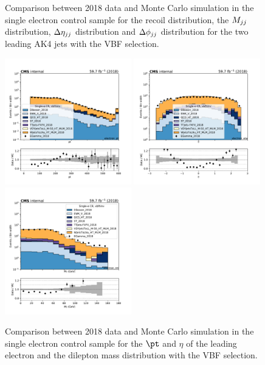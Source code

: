 \begin{figure}[htbp]
\begin{center}
    \end{center}
    \caption{Comparison between 2018 data and Monte Carlo simulation in the single electron control sample for
        the recoil distribution, the $M_{jj}$ distribution, $\Delta \eta_{jj}$ distribution and
        $\Delta \phi_{jj}$ distribution for the two leading AK4 jets with the VBF selection.}
    \label{fig:SE_vbfhinv_2018}
\end{figure}

\begin{figure}[htbp]
    \begin{center}
        \includegraphics[width=0.49\textwidth]{fig/datamc/cr_1e_vbf/cr_1e_vbf_electron_pt_losf_2018.pdf}
        \includegraphics[width=0.49\textwidth]{fig/datamc/cr_1e_vbf/cr_1e_vbf_electron_eta_losf_2018.pdf} \\
        \includegraphics[width=0.49\textwidth]{fig/datamc/cr_1e_vbf/cr_1e_vbf_electron_mt_losf_2018.pdf}
    \end{center}
    \caption{Comparison between 2018 data and Monte Carlo simulation in the single electron control sample for
        the $\pt$ and $\eta$ of the leading electron and the dilepton mass distribution with the VBF selection.}
    \label{fig:SE_2_vbfhinv_2018}
\end{figure}

